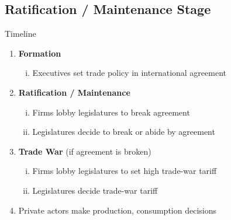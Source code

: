 \documentclass[handout]{beamer}
\newcommand{\bta}{\bm{\tau^a}}
\newcommand{\btn}{\bm{\tau^{tw}}}
\newcommand{\ta}{\theta}
\begin{document}
\subsection{Ratification / Maintenance Stage}
\begin{frame}{Timeline}
\begin{enumerate}
	\item {\color{gray} \textbf{Formation}}
		\begin{enumerate}[i.]
			\item {\color{gray} Executives set trade policy in international agreement}
		\end{enumerate}
	\item \textbf{Ratification / Maintenance}
		\begin{enumerate}[i.]
			\item {\color{gray} Firms lobby legislatures to break agreement}
			\item Legislatures decide to break or abide by agreement
		\end{enumerate}
	\item {\color{gray} \textbf{Trade War} (if agreement is broken)}
		\begin{enumerate}[i.]
			\item {\color{gray} Firms lobby legislatures to set high trade-war tariff}
			\item {\color{gray} Legislatures decide trade-war tariff}
		\end{enumerate}
	\item {\color{gray} Private actors make production, consumption decisions}
\end{enumerate}
\end{frame}


\end{document}

